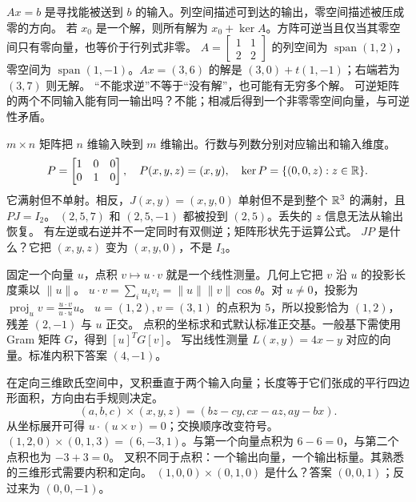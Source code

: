 \idea $Ax=b$ 是寻找能被送到 $b$ 的输入。列空间描述可到达的输出，零空间描述被压成零的方向。
\mathpart 若 $x_0$ 是一个解，则所有解为 $x_0+\ker A$。方阵可逆当且仅当其零空间只有零向量，也等价于行列式非零。
\examplepart $A=\left[\begin{smallmatrix}1&1\\2&2\end{smallmatrix}\right]$ 的列空间为 $\operatorname{span}(1,2)$，零空间为 $\operatorname{span}(1,-1)$。$Ax=(3,6)$ 的解是 $(3,0)+t(1,-1)$；右端若为 $(3,7)$ 则无解。
\pitfall “不能求逆”不等于“没有解”，也可能有无穷多个解。
\exercise 可逆矩阵的两个不同输入能有同一输出吗？不能；相减后得到一个非零零空间向量，与可逆性矛盾。
\nextlesson

\idea $m\times n$ 矩阵把 $n$ 维输入映到 $m$ 维输出。行数与列数分别对应输出和输入维度。
\mathpart
\[P=\begin{bmatrix}1&0&0\\0&1&0\end{bmatrix},\quad P(x,y,z)=(x,y),\quad
\ker P=\{(0,0,z):z\in\mathbb R\}.\]
它满射但不单射。相反，$J(x,y)=(x,y,0)$ 单射但不是到整个 $\mathbb R^3$ 的满射，且 $PJ=I_2$。
\examplepart $(2,5,7)$ 和 $(2,5,-1)$ 都被投到 $(2,5)$。丢失的 $z$ 信息无法从输出恢复。
\pitfall 有左逆或右逆并不一定同时有双侧逆；矩阵形状先于运算公式。
\exercise $JP$ 是什么？它把 $(x,y,z)$ 变为 $(x,y,0)$，不是 $I_3$。
\nextlesson

\idea 固定一个向量 $u$，点积 $v\mapsto u\cdot v$ 就是一个线性测量。几何上它把 $v$ 沿 $u$ 的投影长度乘以 $\|u\|$。
\mathpart $u\cdot v=\sum_i u_iv_i=\|u\|\|v\|\cos\theta$。对 $u\ne0$，投影为 $\operatorname{proj}_u v=\frac{u\cdot v}{u\cdot u}u$。
\examplepart $u=(1,2),v=(3,1)$ 的点积为 $5$，所以投影恰为 $(1,2)$，残差 $(2,-1)$ 与 $u$ 正交。
\pitfall 点积的坐标求和式默认标准正交基。一般基下需使用 Gram 矩阵 $G$，得到 $[u]^T G[v]$。
\exercise 写出线性测量 $L(x,y)=4x-y$ 对应的向量。标准内积下答案 $(4,-1)$。
\nextlesson

\idea 在定向三维欧氏空间中，叉积垂直于两个输入向量；长度等于它们张成的平行四边形面积，方向由右手规则决定。
\mathpart
\[(a,b,c)\times(x,y,z)=(bz-cy,cx-az,ay-bx).\]
从坐标展开可得 $u\cdot(u\times v)=0$；交换顺序改变符号。
\examplepart $(1,2,0)\times(0,1,3)=(6,-3,1)$。与第一个向量点积为 $6-6=0$，与第二个点积也为 $-3+3=0$。
\pitfall 叉积不同于点积：一个输出向量，一个输出标量。其熟悉的三维形式需要内积和定向。
\exercise $(1,0,0)\times(0,1,0)$ 是什么？答案 $(0,0,1)$；反过来为 $(0,0,-1)$。
\nextlesson

